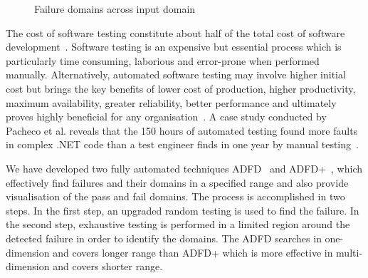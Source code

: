 \documentclass[runningheads,a4paper]{llncs}
\begin{document}
\smallskip
\begin{figure} [H]
\centering
{}
\smallskip
\caption{Failure domains across input domain~\cite{chan1996proportional}}
\label{fig:patterns}
\end{figure} 


The cost of software testing constitute about half of the total cost of software development~\cite{myers2011art}. Software testing is an expensive but essential process which is particularly time consuming, laborious and error-prone when performed manually. Alternatively, automated software testing may involve higher initial cost but brings the key benefits of lower cost of production, higher productivity, maximum availability, greater reliability, better performance and ultimately proves highly beneficial for any organisation~\cite{Beizer1990}. A case study conducted by Pacheco et al. reveals that the 150 hours of automated testing found more faults in complex .NET code than a test engineer finds in one year by manual testing~\cite{pacheco2008finding}.

We have developed two fully automated techniques ADFD~\cite{ahmad2013adfd} and ADFD+~\cite{ahmad2014adfd2}, which effectively find failures and their domains in a specified range and also provide visualisation of the pass and fail domains. The process is accomplished in two steps. In the first step, an upgraded random testing is used to find the failure. In the second step, exhaustive testing is performed in a limited region around the detected failure in order to identify the domains. The ADFD searches in one-dimension and covers longer range than ADFD+ which is more effective in multi-dimension and covers shorter range.
\end{document}
